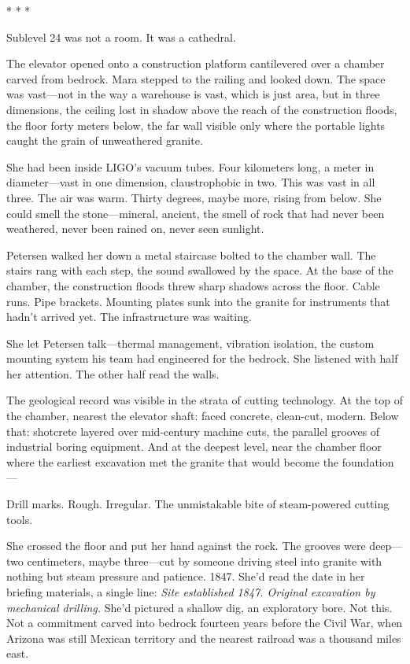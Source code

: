 \documentclass[12pt]{article}
\newcommand{\scenebreak}{\begin{center}* * *\end{center}}
\begin{document}
\scenebreak

Sublevel 24 was not a room. It was a cathedral.

The elevator opened onto a construction platform cantilevered over a chamber carved from bedrock. Mara stepped to the railing and looked down. The space was vast---not in the way a warehouse is vast, which is just area, but in three dimensions, the ceiling lost in shadow above the reach of the construction floods, the floor forty meters below, the far wall visible only where the portable lights caught the grain of unweathered granite.

She had been inside LIGO's vacuum tubes. Four kilometers long, a meter in diameter---vast in one dimension, claustrophobic in two. This was vast in all three. The air was warm. Thirty degrees, maybe more, rising from below. She could smell the stone---mineral, ancient, the smell of rock that had never been weathered, never been rained on, never seen sunlight.

Petersen walked her down a metal staircase bolted to the chamber wall. The stairs rang with each step, the sound swallowed by the space. At the base of the chamber, the construction floods threw sharp shadows across the floor. Cable runs. Pipe brackets. Mounting plates sunk into the granite for instruments that hadn't arrived yet. The infrastructure was waiting.

She let Petersen talk---thermal management, vibration isolation, the custom mounting system his team had engineered for the bedrock. She listened with half her attention. The other half read the walls.

The geological record was visible in the strata of cutting technology. At the top of the chamber, nearest the elevator shaft: faced concrete, clean-cut, modern. Below that: shotcrete layered over mid-century machine cuts, the parallel grooves of industrial boring equipment. And at the deepest level, near the chamber floor where the earliest excavation met the granite that would become the foundation---

Drill marks. Rough. Irregular. The unmistakable bite of steam-powered cutting tools.

She crossed the floor and put her hand against the rock. The grooves were deep---two centimeters, maybe three---cut by someone driving steel into granite with nothing but steam pressure and patience. 1847. She'd read the date in her briefing materials, a single line: \textit{Site established 1847. Original excavation by mechanical drilling.} She'd pictured a shallow dig, an exploratory bore. Not this. Not a commitment carved into bedrock fourteen years before the Civil War, when Arizona was still Mexican territory and the nearest railroad was a thousand miles east.
\end{document}
